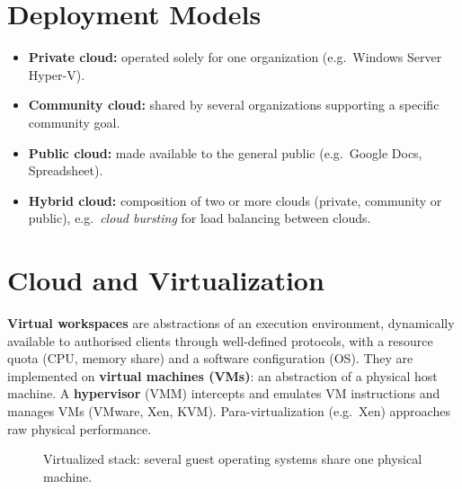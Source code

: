 \documentclass[11pt,a4paper,openany]{report}
\begin{document}
\section{Deployment Models}
\begin{itemize}[leftmargin=*]
  \item \textbf{Private cloud:} operated solely for one organization (e.g.\ Windows Server Hyper-V).
  \item \textbf{Community cloud:} shared by several organizations supporting a specific community goal.
  \item \textbf{Public cloud:} made available to the general public (e.g.\ Google Docs, Spreadsheet).
  \item \textbf{Hybrid cloud:} composition of two or more clouds (private, community or public),
        e.g.\ \emph{cloud bursting} for load balancing between clouds.
\end{itemize}

\section{Cloud and Virtualization}
\textbf{Virtual workspaces} are abstractions of an execution environment, dynamically available to
authorised clients through well-defined protocols, with a resource quota (CPU, memory share) and a
software configuration (OS). They are implemented on \textbf{virtual machines (VMs)}: an abstraction
of a physical host machine. A \textbf{hypervisor} (VMM) intercepts and emulates VM instructions and
manages VMs (VMware, Xen, KVM). Para-virtualization (e.g.\ Xen) approaches raw physical performance.

\begin{figure}[H]
\centering
{}
\caption{Virtualized stack: several guest operating systems share one physical machine.}
\end{figure}
\end{document}
